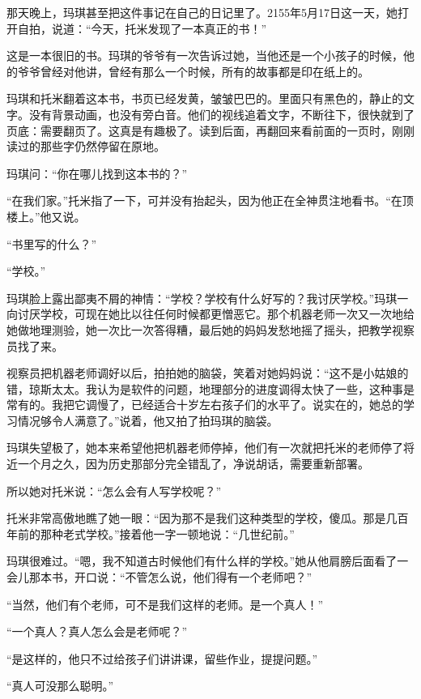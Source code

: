 \documentclass[12pt,UTF-8,openany]{ctexbook}
\begin{document}
\begin{Large}
    
    那天晚上，玛琪甚至把这件事记在自己的日记里了。2155年5月17日这一天，她打开自拍，说道：“今天，托米发现了一本真正的书！”
    
    这是一本很旧的书。玛琪的爷爷有一次告诉过她，当他还是一个小孩子的时候，他的爷爷曾经对他讲，曾经有那么一个时候，所有的故事都是印在纸上的。
    
    玛琪和托米翻着这本书，书页已经发黄，皱皱巴巴的。里面只有黑色的，静止的文字。没有背景动画，也没有旁白音。他们的视线追着文字，不断往下，很快就到了页底：需要翻页了。这真是有趣极了。读到后面，再翻回来看前面的一页时，刚刚读过的那些字仍然停留在原地。
    
    玛琪问：“你在哪儿找到这本书的？”
    
    “在我们家。”托米指了一下，可并没有抬起头，因为他正在全神贯注地看书。“在顶楼上。”他又说。
    
    “书里写的什么？”
    
    “学校。”
    
    玛琪脸上露出鄙夷不屑的神情：“学校？学校有什么好写的？我讨厌学校。”玛琪一向讨厌学校，可现在她比以往任何时候都更憎恶它。那个机器老师一次又一次地给她做地理测验，她一次比一次答得糟，最后她的妈妈发愁地摇了摇头，把教学视察员找了来。
    
    视察员把机器老师调好以后，拍拍她的脑袋，笑着对她妈妈说：“这不是小姑娘的错，琼斯太太。我认为是软件的问题，地理部分的进度调得太快了一些，这种事是常有的。我把它调慢了，已经适合十岁左右孩子们的水平了。说实在的，她总的学习情况够令人满意了。”说着，他又拍了拍玛琪的脑袋。
    
    玛琪失望极了，她本来希望他把机器老师停掉，他们有一次就把托米的老师停了将近一个月之久，因为历史那部分完全错乱了，净说胡话，需要重新部署。
    
    所以她对托米说：“怎么会有人写学校呢？”
    
    托米非常高傲地瞧了她一眼：“因为那不是我们这种类型的学校，傻瓜。那是几百年前的那种老式学校。”接着他一字一顿地说：“几世纪前。”
    
    玛琪很难过。“嗯，我不知道古时候他们有什么样的学校。”她从他肩膀后面看了一会儿那本书，开口说：“不管怎么说，他们得有一个老师吧？”
    
    “当然，他们有个老师，可不是我们这样的老师。是一个真人！”
    
    “一个真人？真人怎么会是老师呢？”
    
    “是这样的，他只不过给孩子们讲讲课，留些作业，提提问题。”
    
    “真人可没那么聪明。”
    

\end{Large}
\end{document}
